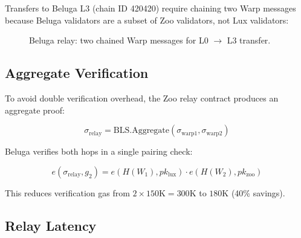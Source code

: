 \documentclass[11pt,letterpaper]{article}
\begin{document}
Transfers to Beluga L3 (chain ID 420420) require chaining two Warp messages because Beluga validators are a subset of Zoo validators, not Lux validators:

\begin{figure}[t]
\centering
{}
\caption{Beluga relay: two chained Warp messages for L0 $\to$ L3 transfer.}
\label{fig:relay}
\end{figure}

\subsection{Aggregate Verification}

To avoid double verification overhead, the Zoo relay contract produces an aggregate proof:

\begin{equation}
\sigma_{\text{relay}} = \text{BLS.Aggregate}(\sigma_{\text{warp1}}, \sigma_{\text{warp2}})
\end{equation}

Beluga verifies both hops in a single pairing check:

\begin{equation}
e(\sigma_{\text{relay}}, g_2) = e(H(W_1), pk_{\text{lux}}) \cdot e(H(W_2), pk_{\text{zoo}})
\end{equation}

This reduces verification gas from $2 \times 150\text{K} = 300\text{K}$ to $180\text{K}$ (40\% savings).

\subsection{Relay Latency}
\end{document}
